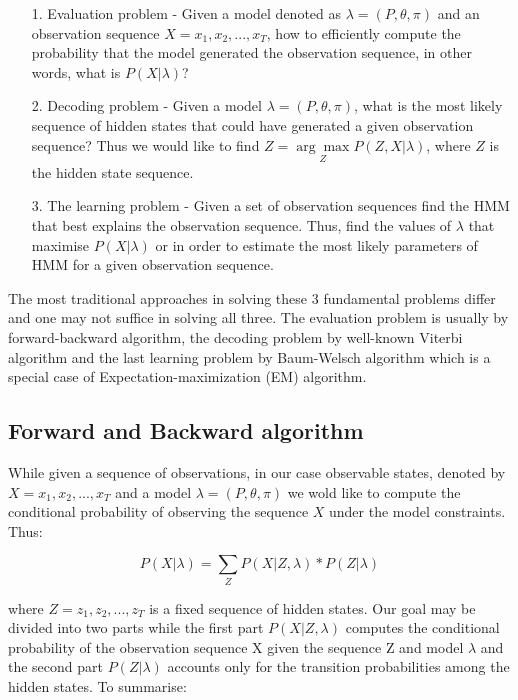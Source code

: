 \begin{itemize}
\item[1.] Evaluation problem - Given a model denoted as $\lambda = (P,\theta,\pi)$ and an observation sequence $X = x_1, x_2,...,x_T$, how to efficiently compute the probability that the model generated the observation sequence, in other words, what is $P(X|\lambda)$? 
\item[2.] Decoding problem - Given a model $\lambda = (P,\theta,\pi)$, what is the most likely sequence of hidden states that could have generated a given observation sequence? Thus we would like to find $Z = \underset{Z}{\arg\max} P(Z,X|\lambda)$, where $Z$ is the hidden state sequence. 
\item[3.] The learning problem - Given a set of observation sequences find the HMM that best explains the observation sequence. Thus, find the values of $\lambda$ that maximise $P(X|\lambda)$ or in order to estimate the most likely parameters of HMM for a given observation sequence. 
\end{itemize}

The most traditional approaches in solving these 3 fundamental problems differ and one may not suffice in solving all three. The evaluation problem is usually by forward-backward algorithm, the decoding problem by well-known Viterbi algorithm and the last learning problem by Baum-Welsch algorithm which is a special case of Expectation-maximization (EM) algorithm. 

\subsection{Forward and Backward algorithm}

While given a sequence of observations, in our case observable states, denoted by $X = x_1,x_2,...,x_T$ and a model $\lambda = (P,\theta,\pi)$ we wold like to compute the conditional probability of observing the sequence $X$ under the model constraints. Thus:

 \begin{equation}
P(X| \lambda) = \sum_Z P(X|Z,\lambda)*P(Z|\lambda)
\end{equation}

where $Z = z_1,z_2,...,z_T$ is a fixed sequence of hidden states. Our goal may be divided into two parts while the first part $P(X|Z,\lambda)$ computes the conditional probability of the observation sequence X given the sequence Z and model $\lambda$ and the second part $P(Z|\lambda)$ accounts only for the transition probabilities among the hidden states. To summarise:

